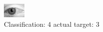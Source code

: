 \begin{figure}[h!]
\begin{center}
\includegraphics[width=0.60\columnwidth]{figures/ID2802_class_4_target_3.png}
\end{center}
\caption{ Classification: 4 actual target: 3}
\label{fig:ID2802_class_4_target_3}
\end{figure}
